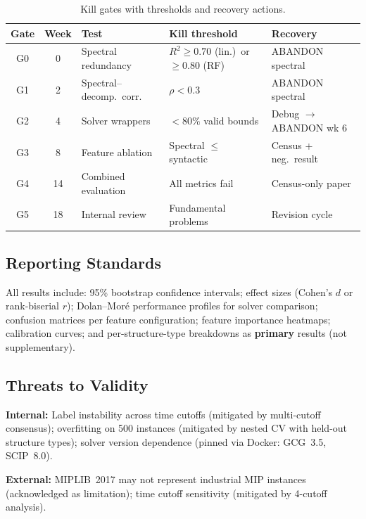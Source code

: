 \documentclass[12pt]{article}
\begin{document}
\begin{table}[ht]
\centering
\caption{Kill gates with thresholds and recovery actions.}
\label{tab:gates}
\small
\begin{tabular}{@{}cclll@{}}
\toprule
Gate & Week & Test & Kill threshold & Recovery \\
\midrule
G0 & 0 & Spectral redundancy & $R^2 \geq 0.70$ (lin.)\ or $\geq 0.80$ (RF) & ABANDON spectral \\
G1 & 2 & Spectral--decomp.\ corr. & $\rho < 0.3$ & ABANDON spectral \\
G2 & 4 & Solver wrappers & $< 80\%$ valid bounds & Debug $\to$ ABANDON wk 6 \\
G3 & 8 & Feature ablation & Spectral $\leq$ syntactic & Census + neg.\ result \\
G4 & 14 & Combined evaluation & All metrics fail & Census-only paper \\
G5 & 18 & Internal review & Fundamental problems & Revision cycle \\
\bottomrule
\end{tabular}
\end{table}

\subsection{Reporting Standards}
\label{sec:reporting}

All results include: 95\% bootstrap confidence intervals; effect sizes
(Cohen's $d$ or rank-biserial $r$); Dolan--Mor\'e performance profiles
\citep{dolan2002benchmarking} for solver comparison; confusion matrices per
feature configuration; feature importance heatmaps; calibration curves;
and per-structure-type breakdowns as \textbf{primary} results (not
supplementary).

\subsection{Threats to Validity}
\label{sec:threats}

\textbf{Internal:} Label instability across time cutoffs (mitigated by
multi-cutoff consensus); overfitting on 500 instances (mitigated by nested
CV with held-out structure types); solver version dependence (pinned via
Docker: GCG~3.5, SCIP~8.0).

\textbf{External:} MIPLIB~2017 may not represent industrial MIP instances
(acknowledged as limitation); time cutoff sensitivity (mitigated by
4-cutoff analysis).
\end{document}
